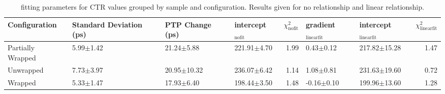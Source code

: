 \begin{table}
\caption{\label{tab:ctrfit-20-results} fitting parameters for CTR values grouped by sample and configuration. Results given for no relationship and linear relationship.}
\begin{tabular}{llllrllr}
\hline
Configuration & Standard Deviation (ps) & PTP Change (ps) & intercept$_\text{nofit}$ &  $\chi^2_\text{nofit}$ & gradient$_\text{linearfit}$ & intercept$_\text{linearfit}$ &  $\chi^2_\text{linearfit}$ \\
\hline
    Partially Wrapped   &  5.99$\pm$1.42 &   21.24$\pm$5.88 &  221.91$\pm$4.70 &                   1.99 &       0.43$\pm$0.12 &   217.82$\pm$15.28 &                    1.47 \\
        Unwrapped     &  7.73$\pm$3.97 &  20.95$\pm$10.32 &  236.07$\pm$6.42 &                   1.14 &       1.08$\pm$0.81 &   231.63$\pm$19.60 &                    0.72 \\
        Wrapped       &  5.33$\pm$1.47 &   17.93$\pm$6.40 &  198.44$\pm$3.50 &                   1.48 &      -0.16$\pm$0.10 &   199.96$\pm$13.60 &                    1.28 \\
\hline
\end{tabular}
\end{table}